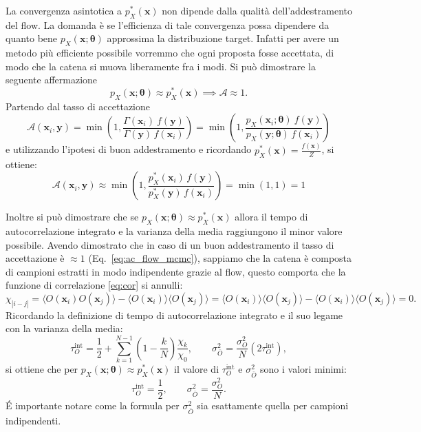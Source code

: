 La convergenza asintotica a $p_X^*(\mathbf{x})$ non dipende dalla qualità dell'addestramento del flow. La domanda è se l'efficienza di tale convergenza possa dipendere da quanto bene  $p_X(\mathbf{x};\boldsymbol{\theta})$ approssima la distribuzione target. Infatti per avere un metodo più efficiente possibile vorremmo che ogni proposta fosse accettata, di modo che la catena si muova liberamente fra i modi.
Si può dimostrare la seguente affermazione
\begin{equation}
    p_X(\mathbf{x};\boldsymbol{\theta}) \approx p_X^*(\mathbf{x}) \implies \mathcal{A} \approx 1.
    \label{eq:ac_flow_mcmc}
\end{equation}
Partendo dal tasso di accettazione
\begin{equation}
    \mathcal{A}(\mathbf{x}_i, \mathbf{y}) = \min\left(1, \frac{\Gamma(\mathbf{x}_i) \ f(\mathbf{y})}{\Gamma(\mathbf{y})\, f(\mathbf{x}_i)}\right) = \min\left(1, \frac{ p_X(\mathbf{x}_i;\boldsymbol{\theta})\ f(\mathbf{y})}{p_X(\mathbf{y};\boldsymbol{\theta})\, f(\mathbf{x}_i)}\right)
\end{equation}
e utilizzando l'ipotesi di buon addestramento e ricordando $p_X^*(\mathbf{x}) = \frac{ f(\mathbf{x})}{Z}$, si ottiene:
\begin{equation}
   \mathcal{A}(\mathbf{x}_i, \mathbf{y}) \approx \min\left(1, \frac{p_X^*(\mathbf{x}_i)\, f(\mathbf{y})}{p_X^*(\mathbf{y})\, f(\mathbf{x}_i)}\right) = \min\left(1, 1 \right) = 1
\end{equation}

Inoltre si può dimostrare che se $p_X(\mathbf{x};\boldsymbol{\theta}) \approx p_X^*(\mathbf{x})$ allora il tempo di autocorrelazione integrato e la varianza della media raggiungono il minor valore possibile.
Avendo dimostrato che in caso di un buon addestramento il tasso di accettazione è $\approx 1$ (Eq.~\ref{eq:ac_flow_mcmc}), sappiamo che la catena è composta di campioni estratti in modo indipendente grazie al flow, questo comporta che la funzione di correlazione \ref{eq:cor} si annulli:
\begin{equation}
    \chi_{|i-j|} = \langle O(\mathbf{x}_i) O(\mathbf{x}_j)\rangle - \langle O(\mathbf{x}_i) \rangle \langle O(\mathbf{x}_j) \rangle = \langle O(\mathbf{x}_i)\rangle \langle O(\mathbf{x}_j)\rangle - \langle O(\mathbf{x}_i) \rangle \langle O(\mathbf{x}_j) \rangle = 0 .
\end{equation}
Ricordando la definizione di tempo di autocorrelazione integrato e il suo legame con la varianza della media:
\begin{equation}
    \tau^{\mathrm{int}}_O = \frac{1}{2} + \sum_{k=1}^{N-1}\left(1-\frac{k}{N}\right)\frac{\chi_k}{\chi_0}, \qquad \sigma^2_{\bar{O}} = \frac{\sigma^2_O}{N} \left( 2\tau^{\mathrm{int}}_O \right),
\end{equation}
si ottiene che per $p_X(\mathbf{x};\boldsymbol{\theta}) \approx p_X^*(\mathbf{x})$ il valore di $\tau^{\mathrm{int}}_O$ e $\sigma^2_{\bar{O}}$ sono i valori minimi:
\begin{equation}
    \tau^{\mathrm{int}}_O = \frac{1}{2}, \qquad \sigma^2_{\bar{O}} = \frac{\sigma^2_O}{N}.
\end{equation}
\'E importante notare come la formula per $\sigma^2_{\bar{O}}$ sia esattamente quella per campioni indipendenti.
